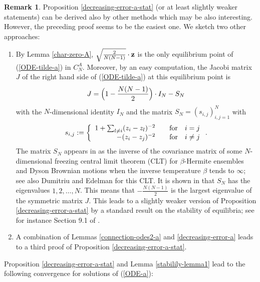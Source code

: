 \documentclass[reqno]{amsart}
\theoremstyle{plain}
\theoremstyle{definition}
\newtheorem{remark}[theorem]{Remark}
\numberwithin{equation}{section}
\begin{document}
 \begin{remark}\label{other-proofs}
   Proposition \ref{decreasing-error-a-stat} (or at least slightly weaker statements) can be derived also by other 
  methods which may be also interesting. However, the preceding proof seems to be the easiest one. We sketch two other approaches:
\begin{enumerate}
\item[\rm{(1)}]  By Lemma \ref{char-zero-A},
  $\sqrt{\frac{2}{N(N-1)}}\cdot  {\bf z }$ is the only equilibrium point of (\ref{ODE-tilde-a})
  in  $C_N^A$. Moreover,  by an easy computation, the  Jacobi matrix $J$ of the right hand side of (\ref{ODE-tilde-a}) at this equilibrium  point is 
  $$J= \Bigl(1-\frac{N(N-1)}{2}\Bigr)\cdot I_N - S_N$$
  with the $N$-dimensional identity  $I_N$ and the matrix $S_N=(s_{i,j})_{i,j=1}^N$ with
\begin{equation}\label{covariance-matrix-A}
s_{i,j}:=\left\{ \begin{array}{r@{\quad\quad}l}  1+\sum_{l\ne i} (z_{i}-z_{l})^{-2} & \text{for}\quad i=j \\
   -(z_{i}-z_{j})^{-2} & \text{for}\quad i\ne j  \end{array}  \right.  . 
\end{equation}
The matrix $S_N$ appears in \cite{V, AV2} as the inverse of the covariance matrix of some $N$-dimensional
freezing central limit theorem (CLT) for $\beta$-Hermite ensembles and Dyson Brownian motions when the inverse temperature $\beta$ tends to $\infty$;
see also
 Dumitriu and Edelman \cite{DE2} for this CLT.
It is shown in \cite{AV2} that $S_N$ 
has the eigenvalues $1,2,\ldots,N$. This means that $-\frac{N(N-1)}{2}$ is the largest eigenvalue of the symmetric matrix $J$.
This leads to a slightly weaker version of Proposition \ref{decreasing-error-a-stat}
by a standard result on the stability of equilibria;
see for instance Section 9.1 of \cite{HS}.
\item[\rm{(2)}] A combination of Lemmas \ref{connection-odes2-a}
and  \ref{decreasing-error-a} leads to a third proof  of Proposition \ref{decreasing-error-a-stat}.
\end{enumerate}
\end{remark}

 Proposition \ref{decreasing-error-a-stat} and 
Lemma \ref{stabilily-lemma1} lead to the following  convergence for solutions of  (\ref{ODE-a}):
\end{document}
